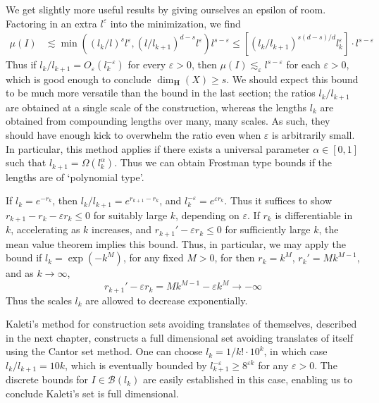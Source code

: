 We get slightly more useful results by giving ourselves an epsilon of room. Factoring in an extra $l^\varepsilon$ into the minimization, we find
%
\begin{align*}
    \mu(I) &\lesssim \min((l_k/l)^s l^\varepsilon, (l/l_{k+1})^{d-s} l^\varepsilon) l^{s - \varepsilon} \leq \left[ (l_k/l_{k+1})^{s(d-s)/d} l_k^\varepsilon \right] \cdot l^{s - \varepsilon}
\end{align*}
%
Thus if $l_k/l_{k+1} = O_\varepsilon(l_k^{- \varepsilon})$ for every $\varepsilon > 0$, then $\mu(I) \lesssim_\varepsilon l^{s - \varepsilon}$ for each $\varepsilon > 0$, which is good enough to conclude $\dim_{\mathbf{H}}(X) \geq s$. We should expect this bound to be much more versatile than the bound in the last section; the ratios $l_k/l_{k+1}$ are obtained at a single scale of the construction, whereas the lengths $l_k$ are obtained from compounding lengths over many, many scales. As such, they should have enough kick to overwhelm the ratio even when $\varepsilon$ is arbitrarily small. In particular, this method applies if there exists a universal parameter $\alpha \in [0,1]$ such that $l_{k+1} = \Omega(l_k^\alpha)$. Thus we can obtain Frostman type bounds if the lengths are of `polynomial type'.

\begin{example}
    If $l_k = e^{-r_k}$, then $l_k/l_{k+1} = e^{r_{k+1} - r_k}$, and $l_k^{-\varepsilon} = e^{\varepsilon r_k}$. Thus it suffices to show $r_{k+1} - r_k - \varepsilon r_k \leq 0$ for suitably large $k$, depending on $\varepsilon$. If $r_k$ is differentiable in $k$, accelerating as $k$ increases, and $r_{k+1}' - \varepsilon r_k \leq 0$ for sufficiently large $k$, the mean value theorem implies this bound. Thus, in particular, we may apply the bound if $l_k = \exp(-k^M)$, for any fixed $M > 0$, for then $r_k = k^M$, $r_k' = Mk^{M-1}$, and as $k \to \infty$,
    \[ r_{k+1}' - \varepsilon r_k = Mk^{M-1} - \varepsilon k^M \to -\infty \]
    Thus the scales $l_k$ are allowed to decrease exponentially.
\end{example}

\begin{example}
    Kaleti's method for construction sets avoiding translates of themselves, described in the next chapter, constructs a full dimensional set avoiding translates of itself using the Cantor set method. One can choose $l_k = 1/k! \cdot 10^k$, in which case $l_k/l_{k+1} = 10k$, which is eventually bounded by $l_{k+1}^{-\varepsilon} \geq 8^{\varepsilon k}$ for any $\varepsilon > 0$. The discrete bounds for $I \in \mathcal{B}(l_k)$ are easily established in this case, enabling us to conclude Kaleti's set is full dimensional.
\end{example}

